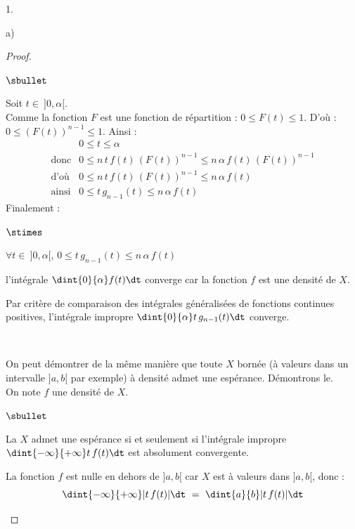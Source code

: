 \documentclass[11pt]{article}%
\begin{document}
\begin{noliste}{1.}
\begin{noliste}{a)}
\begin{proof}
\begin{noliste}{$\sbullet$}
	
	\item Soit $t \in \ ]0, \alpha[$.\\
	Comme la fonction $F$ est une fonction de répartition : 
	$0 \leq F(t) \leq 1$. D'où : $0 \leq (F(t))^{n-1} \leq 1$.
	Ainsi :
	\[
	  \begin{array}{cl}
	    & 0 \leq t \leq \alpha
	    \\[.4cm]
	    \text{donc} & 0 \leq n \, t \, f(t) \, (F(t))^{n-1} \leq
	    n \, \alpha \, f(t) \, (F(t))^{n-1}
	    \\[.4cm]
	    \text{d'où} & 0 \leq n \, t \, f(t) \, (F(t))^{n-1} \leq
	    n \, \alpha \, f(t)
	    \\[.4cm]
	    \text{ainsi} & 0 \leq t \, g_{n-1}(t) \leq n \, \alpha \,
	    f(t)
	  \end{array}
	\]
	Finalement :
	\begin{noliste}{$\stimes$}
	  \item $\forall t \in \ ]0,\alpha[$, $0 \leq t \, g_{n-1}(t)
	  \leq n \, \alpha \, f(t)$
	  \item l'intégrale $\dint{0}{\alpha} f(t) \dt$ converge 
	  car la fonction $f$ est une densité de $X$.
	\end{noliste}
	Par critère de comparaison des intégrales généralisées de 
	fonctions continues positives, l'intégrale impropre 
	$\dint{0}{\alpha} t \, g_{n-1}(t) \dt$ converge.
      \end{noliste}
      ~\\[-1.2cm]
      
      \begin{remarkL}{.96}
        On peut démontrer de la même manière que toute \var $X$ bornée
        (à valeurs dans un intervalle $]a,b[$ par exemple)
        à densité admet une espérance. Démontrons le.\\[.1cm]
        On note $f$ une densité de $X$. 
        \begin{noliste}{$\sbullet$}
          \item La \var $X$ admet une espérance si et seulement si 
          l'intégrale impropre $\dint{-\infty}{+\infty} t \, f(t) \dt$
          est absolument convergente.
          
          \item La fonction $f$ est nulle en dehors de $]a,b[$ car 
          $X$ est à valeurs dans $]a,b[$, donc :
          \[
            \dint{-\infty}{+\infty} \vert t \, f(t) \vert \dt \ = \
            \dint{a}{b} \vert t \, f(t) \vert \dt
          \]
          

\end{noliste}
\end{remarkL}
\end{proof}
\end{noliste}
\end{noliste}
\end{document}
